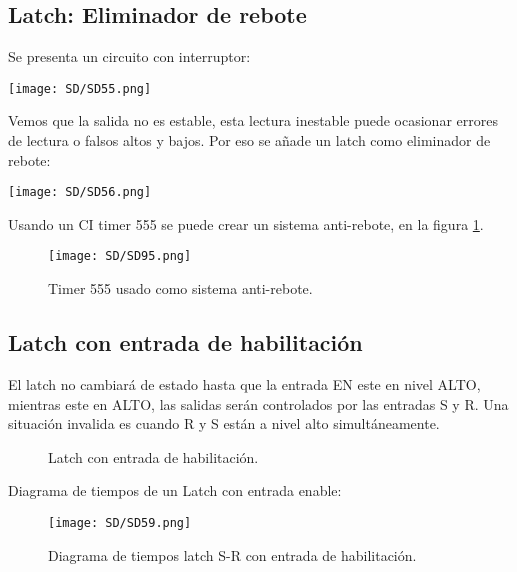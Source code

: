 \documentclass[
	12pt, %
	fleqn, %
	a4paper, %
	oneside, %
]{LegrandOrangeBook}
\begin{document}
\subsection{Latch: Eliminador de rebote}
Se presenta un circuito con interruptor:\\
\begin{center}
\texttt{[image: SD/SD55.png]}
\end{center}
Vemos que la salida no es estable, esta lectura inestable puede ocasionar errores de lectura o falsos altos y bajos. Por eso se añade un latch como eliminador de rebote:\\
\begin{center}
\texttt{[image: SD/SD56.png]}
\end{center}
Usando un CI timer 555 se puede crear un sistema anti-rebote, en la figura \ref{fig:timer 555}.
\begin{figure}[H]
\centering
\texttt{[image: SD/SD95.png]}
\caption{Timer 555 usado como sistema anti-rebote.}
\label{fig:timer 555}
\end{figure}
\subsection{Latch con entrada de habilitación}
El latch no cambiará de estado hasta que la entrada EN este en nivel ALTO, mientras este en ALTO, las salidas serán controlados por las entradas S y R. Una situación invalida es cuando R y S están a nivel alto simultáneamente.
\begin{figure}[h]
    \centering
    \qquad
    \caption{Latch con entrada de habilitación.}
\end{figure}
Diagrama de tiempos de un Latch con entrada enable:
\begin{figure}[H]
\centering
\texttt{[image: SD/SD59.png]}
\caption{Diagrama de tiempos latch S-R con entrada de habilitación.}
\end{figure}
\end{document}
